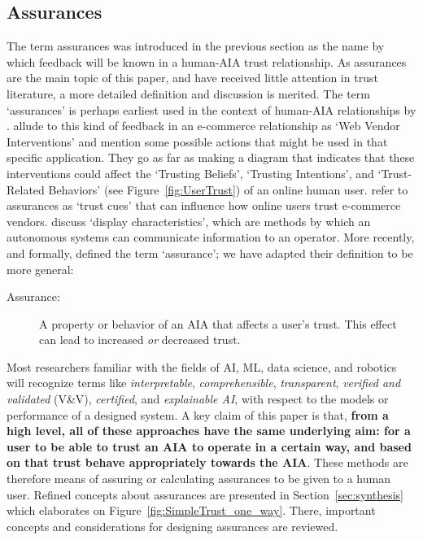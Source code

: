 \subsection{Assurances} \label{sec:assurances}
    The term assurances was introduced in the previous section as the name by which feedback will be known in a human-AIA trust relationship. As assurances are the main topic of this paper, and have received little attention in trust literature, a more detailed definition and discussion is merited. The term `assurances' is perhaps earliest used in the context of human-AIA relationships by \citet{Sheridan1984-kx}. \citet{McKnight2001-fa} allude to this kind of feedback in an e-commerce relationship as `Web Vendor Interventions' and mention some possible actions that might be used in that specific application. They go as far as making a diagram that indicates that these interventions could affect the `Trusting Beliefs', `Trusting Intentions', and `Trust-Related Behaviors' (see Figure~\ref{fig:UserTrust}) of an online human user. \citet{Corritore2003-gx} refer to assurances as `trust cues' that can influence how online users trust e-commerce vendors. \citet{Lee2004-pv} discuss `display characteristics', which are methods by which an autonomous systems can communicate information to an operator. More recently, and formally, \citet{Lillard2016-yg} defined the term `assurance'; we have adapted their definition to be more general:    
    \begin{description}
        \item [Assurance:] A property or behavior of an AIA that affects a user's trust. This effect can lead to increased \emph{or} decreased trust. 
    \end{description}

    Most researchers familiar with the fields of AI, ML, data science, and robotics will recognize terms like \emph{interpretable}, \emph{comprehensible}, \emph{transparent}, \emph{verified and validated} (V\&V), \emph{certified}, and \emph{explainable AI}, with respect to the models or performance of a designed system. A key claim of this paper is that, \textbf{from a high level, all of these approaches have the same underlying aim: for a user to be able to trust an AIA to operate in a certain way, and based on that trust behave appropriately towards the AIA}. These methods are therefore means of assuring or calculating assurances to be given to a human user. 
Refined concepts about assurances are presented in Section~\ref{sec:synthesis} which elaborates on Figure~\ref{fig:SimpleTrust_one_way}. There, important concepts and considerations for designing assurances are reviewed. 
